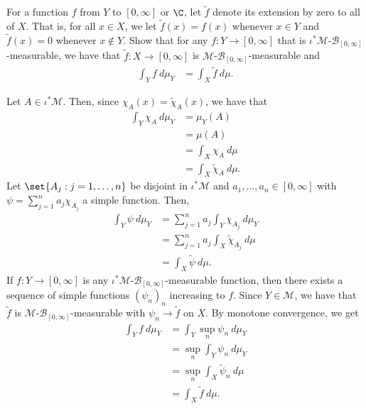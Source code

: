\documentclass[10pt]{mypackage}
\begin{document}
\begin{problem}
  For a function $f$ from $Y$ to $[0,\infty]$ or $\C$, let $ \widetilde{f} $ denote its extension by zero to all of $X$. That is, for all $x\in X$, we let $ \widetilde{f}(x) = f(x) $ whenever $x\in Y$ and $\widetilde{f}(x) = 0$ whenever $x\notin Y$. Show that for any $f\colon Y\to [0,\infty]$ that is $\iota^{\ast}\mathcal{M}$-$\mathcal{B}_{[0,\infty]}$-measurable, we have that $ \widetilde{f}\colon X\to [0,\infty] $ is $ \mathcal{M} $-$\mathcal{B}_{[0,\infty]}$-measurable and
  \begin{align*}
    \int_{Y}^{} f\:d\mu_Y &= \int_{X}^{} \widetilde{f}\:d\mu.
  \end{align*}
\end{problem}
\begin{solution}
  Let $A\in \iota^{\ast}\mathcal{M}$. Then, since $ \chi_A(x) = \widetilde{\chi}_A(x) $, we have that
  \begin{align*}
    \int_{Y}^{} \chi_A\:d\mu_Y &= \mu_Y(A)\\
                               &= \mu(A)\\
                               &= \int_{X}^{} \chi_A\:d\mu\\
                               &= \int_{X}^{} \widetilde{\chi}_A\:d\mu.
  \end{align*}
  Let $\set{A_j : j=1,\dots,n}$ be disjoint in $\iota^{\ast}\mathcal{M}$ and $a_1,\dots,a_n\in [0,\infty]$ with $\psi = \sum_{j=1}^{n}a_j\chi_{A_j}$ a simple function. Then,
  \begin{align*}
    \int_{Y}^{} \psi\:d\mu_Y &= \sum_{j=1}^{n}a_j\int_{Y}^{} \chi_{A_j}\:d\mu_Y\\
                             &= \sum_{j=1}^{n}a_j\int_{X}^{} \widetilde{\chi}_{A_j}\:d\mu\\
                             &= \int_{X}^{} \widetilde{\psi}\:d\mu.
  \end{align*}
  If $f\colon Y\to [0,\infty]$ is any $ \iota^{\ast}\mathcal{M} $-$\mathcal{B}_{[0,\infty]}$-measurable function, then there exists a sequence of simple functions $\left( \psi_n \right)_n$ increasing to $f$. Since $Y\in \mathcal{M}$, we have that $ \widetilde{f} $ is $\mathcal{M}$-$\mathcal{B}_{[0,\infty]}$-measurable with $\psi_n\to \widetilde{f}$ on $X$. By monotone convergence, we get
  \begin{align*}
    \int_{Y}^{} f\:d\mu_Y &= \int_{Y}^{} \sup_{n}\psi_n\:d\mu_Y\\
                          &= \sup_{n} \int_{Y}^{} \psi_n\:d\mu_Y\\
                          &= \sup_{n} \int_{X}^{} \widetilde{\psi}_n\:d\mu\\
                          &= \int_{X}^{} \widetilde{f}\:d\mu.
  \end{align*}
\end{solution}
\end{document}
